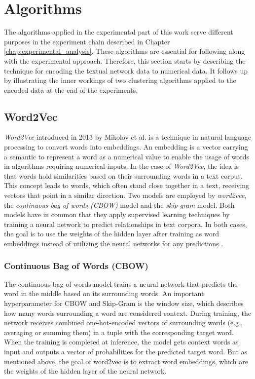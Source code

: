 \section{Algorithms}
The algorithms applied in the experimental part of this work serve different purposes in the experiment chain described in Chapter \ref{chap:experimental_analysis}. These algorithms are essential for following along with the experimental approach. Therefore, this section starts by describing the technique for encoding the textual network data to numerical data. It follows up by illustrating the inner workings of two clustering algorithms applied to the encoded data at the end of the experiments.


\subsection{Word2Vec}
\emph{Word2Vec} introduced in 2013 by Mikolov et al. is a technique in natural language processing to convert words into embeddings. An embedding is a vector carrying a semantic to represent a word as a numerical value to enable the usage of words in algorithms requiring numerical inputs. In the case of \emph{Word2Vec}, the idea is that words hold similarities based on their surrounding words in a text corpus. This concept leads to words, which often stand close together in a text, receiving vectors that point in a similar direction. Two models are employed by \emph{word2vec}, the \emph{continuous bag of words (CBOW)} model and the \emph{skip-gram} model. Both models have in common that they apply supervised learning techniques by training a neural network to predict relationships in text corpora. In both cases, the goal is to use the weights of the hidden layer after training as word embeddings instead of utilizing the neural networks for any predictions \cite{mikolov2013efficient} \cite{rong2014word2vec}.

\subsubsection{Continuous Bag of Words (CBOW)}
The continuous bag of words model trains a neural network that predicts the word in the middle based on its surrounding words. An important hyperparameter for CBOW and Skip-Gram is the window size, which describes how many words surrounding a word are considered context. 
During training, the network receives combined one-hot-encoded vectors of surrounding words (e.g., averaging or summing them) in a tuple with the corresponding target word. When the training is completed at inference, the model gets context words as input and outputs a vector of probabilities for the predicted target word. But as mentioned above, the goal of word2vec is to extract word embeddings, which are the weights of the hidden layer of the neural network.


